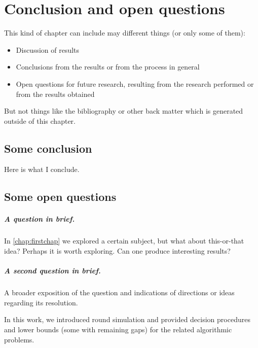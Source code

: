 \chapter{Conclusion and open questions}
\label{chap:conclusion}
\label{chap:discussion}
\label{chap:future}

This kind of chapter can include may different things (or only some of them):
\begin{itemize}
\item Discussion of results
\item Conclusions from the results or from the process in general
\item Open questions for future research, resulting from the research performed or from the results obtained
\end{itemize}

But not things like the bibliography or other back matter which is generated outside of this chapter.


\section{Some conclusion}

Here is what I conclude.

\section{Some open questions}

\paragraph{A question in brief.} In \autoref{chap:firstchap} we explored a certain subject, but what about this-or-that idea? Perhaps it is worth exploring. Can one produce interesting results?

\paragraph{A second question in brief.} A broader exposition of the question and indications of directions or ideas regarding its resolution.

In this work, we introduced round simulation and provided decision procedures and lower bounds (some with remaining gaps) for the related algorithmic problems.

